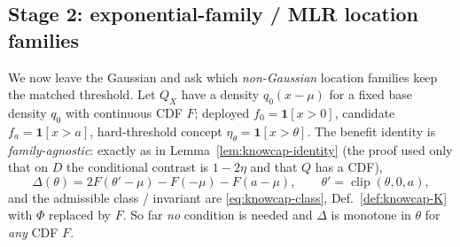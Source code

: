 \subsection{Stage 2: exponential-family / MLR location families}\label{sec:gen-mlr}
We now leave the Gaussian and ask which \emph{non-Gaussian} location families keep
the matched threshold. Let $Q_X$ have a density $q_0(x-\mu)$ for a fixed base density
$q_0$ with continuous CDF $F$; deployed $f_0=\mathbf 1[x>0]$, candidate
$f_a=\mathbf 1[x>a]$, hard-threshold concept $\eta_\theta=\mathbf 1[x>\theta]$. The
benefit identity is \emph{family-agnostic}: exactly as in
Lemma~\ref{lem:knowcap-identity} (the proof used only that on $D$ the conditional
contrast is $1-2\eta$ and that $Q$ has a CDF),
\begin{equation}\label{eq:gen-fam-delta}
  \Delta(\theta)=2F(\theta'-\mu)-F(-\mu)-F(a-\mu),\qquad\theta'=\operatorname{clip}(\theta,0,a),
\end{equation}
and the admissible class / invariant are \eqref{eq:knowcap-class},
Def.~\ref{def:knowcap-K} with $\Phi$ replaced by $F$. So far \emph{no} condition is
needed and $\Delta$ is monotone in $\theta$ for \emph{any} CDF $F$.

